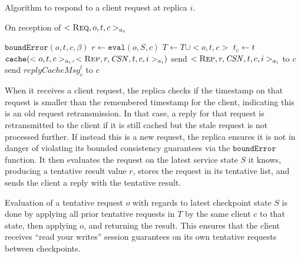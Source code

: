 \documentclass[twocolumn,10pt]{article}
\begin{document}
{\begin{algorithm}
\small
\caption{Algorithm to respond to a client request at replica $i$. }
On reception of $<\textsc{Req}, o, t, c>_{a_c}$
\begin{algorithmic}[1]\label{alg:replicaReply}
\STATE $\mathtt{boundError}(o, t, c, \beta)$ 
\STATE $r \leftarrow \mathtt{eval}(o, S, c)$ 
  \label{lin:sendReply}
\STATE $T \leftarrow T \cup <o, t, c>$ 
\STATE $t_c \leftarrow t$ 
\STATE $\mathtt{cache}(<o, t, c>_{a_c}, <\textsc{Rep}, r, \mathit{CSN}, t, c,
    i>_{a_i})$ 
\STATE send $<\textsc{Rep}, r, \mathit{CSN}, t, c, i>_{a_i}$ to $c$
\ELSE
{}
\STATE send $\mathit{replyCacheMsg}_c^t$ to  $c$ 
 
\ENDIF
\ENDIF
\end{algorithmic}
\end{algorithm}

When it receives a client request, the replica checks if the timestamp
on that request is smaller than the remembered timestamp for the
client, indicating this is an old request retransmission. In that case,
a reply for that request is retransmitted to the client if it is still
cached but the stale request is not processed further.  If instead this
is a new request, the replica ensures it is not in danger of violating its
bounded consistency guarantees via the $\mathtt{boundError}$
function. It then evaluates the request on the latest service state $S$
it knows, producing a tentative result value $r$, stores the request in its
tentative list, and sends the client a reply with the tentative result.

Evaluation of a tentative request $o$ with regards to latest checkpoint
state $S$ is done by applying all prior tentative requests in $T$ by the same
client $c$ to that state, then applying $o$, and returning the result.
This ensures that the client receives ``read your writes'' session
guarantees on its own tentative requests between checkpoints.

}
\end{document}
